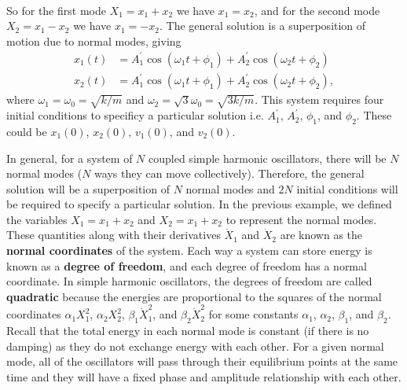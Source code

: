 \documentclass[../classical_mechanics.tex]{subfiles}
\begin{document}
\begin{example}
\begin{align}
            \end{align}
            So for the first mode $X_1=x_1+x_2$ we have $x_1=x_2$, and for the second mode $X_2=x_1-x_2$ we have $x_1=-x_2$.
            The general solution is a superposition of motion due to normal modes, giving
            \begin{align}
                x_1(t)&=A_1^\prime\cos(\omega_1 t+\phi_1)+A_2^\prime\cos(\omega_2 t+\phi_2)\\
                x_2(t)&=A_1^\prime\cos(\omega_1 t+\phi_1)+A_2^\prime\cos(\omega_2 t+\phi_2),
            \end{align}
            where $\omega_1=\omega_0=\sqrt{k/m}$ and $\omega_2=\sqrt{3}\omega_0=\sqrt{3k/m}$.
            This system requires four initial conditions to specificy a particular solution i.e. $A_1^\prime$, $A_2^\prime$, $\phi_1$, and $\phi_2$.
            These could be $x_1(0)$, $x_2(0)$, $v_1(0)$, and $v_2(0)$.
        \end{example}

        In general, for a system of $N$ coupled simple harmonic oscillators, there will be $N$ normal modes ($N$ ways they can move collectively).
        Therefore, the general solution will be a superposition of $N$ normal modes and $2N$ initial conditions will be required to specify a particular solution.
        In the previous example, we defined the variables $X_1=x_1+x_2$ and $X_2=x_1+x_2$ to represent the normal modes.
        These quantities along with their derivatives $\dot{X}_1$ and $\dot{X}_2$ are known as the \textbf{normal coordinates} of the system.
        Each way a system can store energy is known as a \textbf{degree of freedom}, and each degree of freedom has a normal coordinate.
        In simple harmonic oscillators, the degrees of freedom are called \textbf{quadratic} because the energies are proportional to the squares of the normal coordinates $\alpha_1X_1^2$, $\alpha_2X_2^2$, $\beta_1\dot{X}_1^2$, and $\beta_2\dot{X}_2^2$ for some constants $\alpha_1$, $\alpha_2$, $\beta_1$, and $\beta_2$.
        Recall that the total energy in each normal mode is constant (if there is no damping) as they do not exchange energy with each other.
        For a given normal mode, all of the oscillators will pass through their equilibrium points at the same time and they will have a fixed phase and amplitude relationship with each other.

\end{document}
